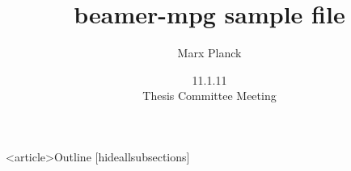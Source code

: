\documentclass[english,aspectratio=1610]{beamer}
\title{beamer-mpg sample file}
\author{Marx Planck}
\date{11.1.11\\Thesis Committee Meeting}
\institute{MPI}
\begin{document}
\begin{frame}[label=mytitle]
 \titlepage
\end{frame}

\begin{frame}<article>{Outline}
 \tableofcontents{}[hideallsubsections]
\end{frame}

\end{document}
